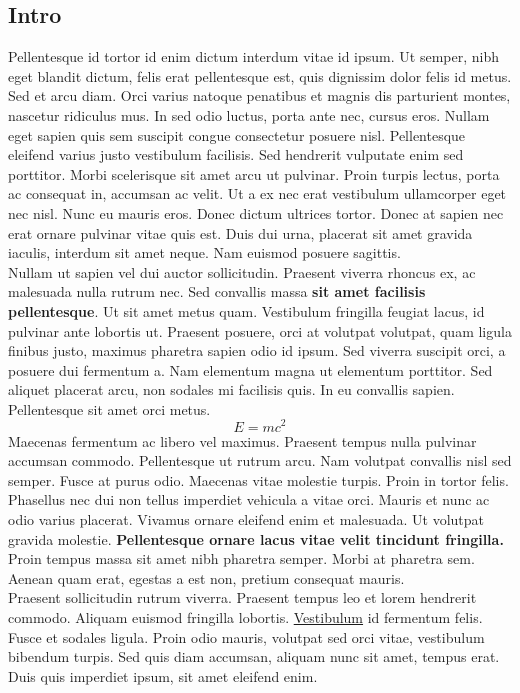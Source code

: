 \documentclass[12pt,a4paper]{article}
\begin{document}
	\subsection{Intro}
	Pellentesque id tortor id enim dictum interdum vitae id ipsum. Ut semper, nibh eget blandit dictum, felis erat pellentesque est, quis dignissim dolor felis id metus. Sed et arcu diam. Orci varius natoque penatibus et magnis dis parturient montes, nascetur ridiculus mus. In sed odio luctus, porta ante nec, cursus eros. Nullam eget sapien quis sem suscipit congue consectetur posuere nisl. Pellentesque eleifend varius justo vestibulum facilisis. Sed hendrerit vulputate enim sed porttitor. Morbi scelerisque sit amet arcu ut pulvinar. Proin turpis lectus, porta ac consequat in, accumsan ac velit. Ut a ex nec erat vestibulum ullamcorper eget nec nisl. Nunc eu mauris eros. Donec dictum ultrices tortor. Donec at sapien nec erat ornare pulvinar vitae quis est. Duis dui urna, placerat sit amet gravida iaculis, interdum sit amet neque. Nam euismod posuere sagittis. \\Nullam ut sapien vel dui auctor sollicitudin. Praesent viverra rhoncus ex, ac malesuada nulla rutrum nec. Sed convallis massa \textbf{sit amet facilisis pellentesque}. Ut sit amet metus quam. Vestibulum fringilla feugiat lacus, id pulvinar ante lobortis ut. Praesent posuere, orci at volutpat volutpat, quam ligula finibus justo, maximus pharetra sapien odio id ipsum. Sed viverra suscipit orci, a posuere dui fermentum a. Nam elementum magna ut elementum porttitor. Sed aliquet placerat arcu, non sodales mi facilisis quis. In eu convallis sapien. Pellentesque sit amet orci metus. 
	\[E=mc^2\]
	Maecenas fermentum ac libero vel maximus. Praesent tempus nulla pulvinar accumsan commodo. Pellentesque ut rutrum arcu. Nam volutpat convallis nisl sed semper. Fusce at purus odio. Maecenas vitae molestie turpis. Proin in tortor felis. Phasellus nec dui non tellus imperdiet vehicula a vitae orci. Mauris et nunc ac odio varius placerat. Vivamus ornare eleifend enim et malesuada. Ut volutpat gravida molestie. \textbf{Pellentesque ornare lacus vitae velit tincidunt fringilla.}  Proin tempus massa sit amet nibh pharetra semper. Morbi at pharetra sem. Aenean quam erat, egestas a est non, pretium consequat mauris. \\Praesent sollicitudin rutrum viverra. Praesent tempus leo et lorem hendrerit commodo. Aliquam euismod fringilla lobortis. \underline{Vestibulum} id fermentum felis. Fusce et sodales ligula. Proin odio mauris, volutpat sed orci vitae, vestibulum bibendum turpis. Sed quis diam accumsan, aliquam nunc sit amet, tempus erat. Duis quis imperdiet ipsum, sit amet eleifend enim. 
\end{document}
